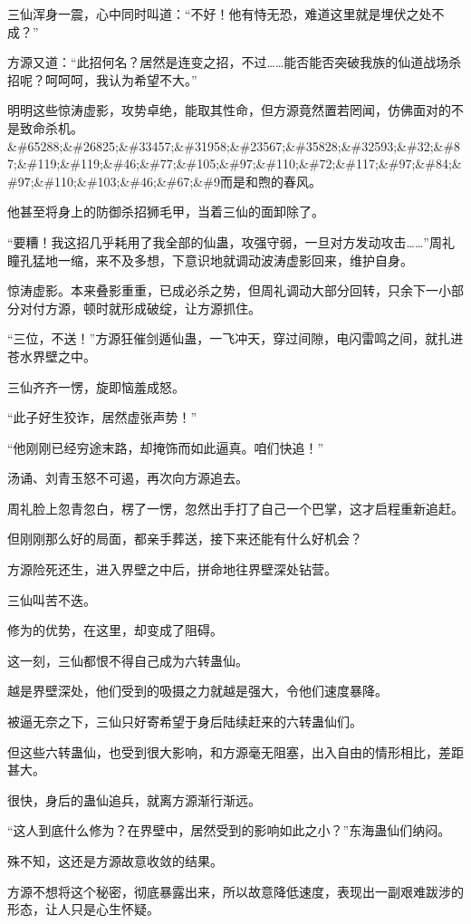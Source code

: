 \begin{this_body}
三仙浑身一震，心中同时叫道：“不好！他有恃无恐，难道这里就是埋伏之处不成？”

方源又道：“此招何名？居然是连变之招，不过……能否能否突破我族的仙道战场杀招呢？呵呵呵，我认为希望不大。”

明明这些惊涛虚影，攻势卓绝，能取其性命，但方源竟然置若罔闻，仿佛面对的不是致命杀机。\&\#65288;\&\#26825;\&\#33457;\&\#31958;\&\#23567;\&\#35828;\&\#32593;\&\#32;\&\#87;\&\#119;\&\#119;\&\#46;\&\#77;\&\#105;\&\#97;\&\#110;\&\#72;\&\#117;\&\#97;\&\#84;\&\#97;\&\#110;\&\#103;\&\#46;\&\#67;\&\#9而是和煦的春风。

他甚至将身上的防御杀招狮毛甲，当着三仙的面卸除了。

“要糟！我这招几乎耗用了我全部的仙蛊，攻强守弱，一旦对方发动攻击……”周礼瞳孔猛地一缩，来不及多想，下意识地就调动波涛虚影回来，维护自身。

惊涛虚影。本来叠影重重，已成必杀之势，但周礼调动大部分回转，只余下一小部分对付方源，顿时就形成破绽，让方源抓住。

“三位，不送！”方源狂催剑遁仙蛊，一飞冲天，穿过间隙，电闪雷鸣之间，就扎进苍水界壁之中。

三仙齐齐一愣，旋即恼羞成怒。

“此子好生狡诈，居然虚张声势！”

“他刚刚已经穷途末路，却掩饰而如此逼真。咱们快追！”

汤诵、刘青玉怒不可遏，再次向方源追去。

周礼脸上忽青忽白，楞了一愣，忽然出手打了自己一个巴掌，这才启程重新追赶。

但刚刚那么好的局面，都亲手葬送，接下来还能有什么好机会？

方源险死还生，进入界壁之中后，拼命地往界壁深处钻营。

三仙叫苦不迭。

修为的优势，在这里，却变成了阻碍。

这一刻，三仙都恨不得自己成为六转蛊仙。

越是界壁深处，他们受到的吸摄之力就越是强大，令他们速度暴降。

被逼无奈之下，三仙只好寄希望于身后陆续赶来的六转蛊仙们。

但这些六转蛊仙，也受到很大影响，和方源毫无阻塞，出入自由的情形相比，差距甚大。

很快，身后的蛊仙追兵，就离方源渐行渐远。

“这人到底什么修为？在界壁中，居然受到的影响如此之小？”东海蛊仙们纳闷。

殊不知，这还是方源故意收敛的结果。

方源不想将这个秘密，彻底暴露出来，所以故意降低速度，表现出一副艰难跋涉的形态，让人只是心生怀疑。


\end{this_body}
